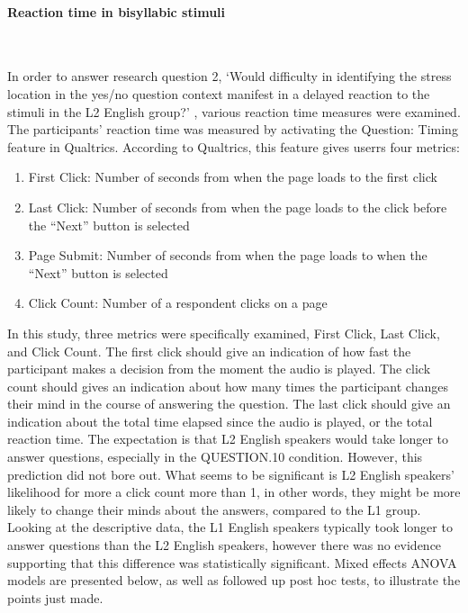 \documentclass[a4paper]{article}
\begin{document}
\paragraph{Reaction time in bisyllabic stimuli} \

In order to answer research question 2, `Would difficulty in identifying the stress location in the yes/no question context manifest in a delayed reaction to the stimuli in the L2 English group?' , various reaction time measures were examined. The participants' reaction time was measured by activating the Question: Timing feature in Qualtrics. According to Qualtrics, this feature gives userrs four metrics:

\begin{enumerate}
\item First Click: Number of seconds from when the page loads to the first click 
\item Last Click: Number of seconds from when the page loads to the click before the “Next” button is selected 
\item Page Submit: Number of seconds from when the page loads to when the “Next” button is selected 
\item Click Count: Number of a respondent clicks on a page 
\end{enumerate}

In this study, three metrics were specifically examined, First Click, Last Click, and Click Count. The first click should give an indication of how fast the participant makes a decision from the moment the audio is played. The click count should gives an indication about how many times the participant changes their mind in the course of answering the question. The last click should give an indication about the total time elapsed since the audio is played, or the total reaction time. The expectation is that L2 English speakers would take longer to answer questions, especially in the QUESTION.10 condition. However, this prediction did not bore out. What seems to be significant is L2 English speakers' likelihood for more a click count more than 1, in other words, they might be more likely to change their minds about the answers, compared to the L1 group. Looking at the descriptive data, the L1 English speakers typically took longer to answer questions than the L2 English speakers, however there was no evidence supporting that this difference was statistically significant. Mixed effects ANOVA models are presented below, as well as followed up post hoc tests, to illustrate the points just made.
\end{document}
